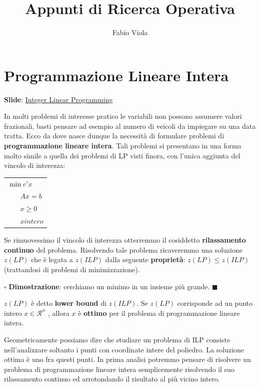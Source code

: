 \documentclass[11pt]{book}
\title{Appunti di Ricerca Operativa}
\author{Fabio Viola}
\date{}
\begin{document}
\chapter{Programmazione Lineare Intera}

\scriptsize
{\bf Slide}:
\href{http://www.or.deis.unibo.it/staff_pages/martello/Chapter6.zip}{Integer
Linear Programming}
\normalsize
\vspace{20pt}

In molti problemi di interesse pratico le variabili non possono
assumere valori frazionali, basti pensare ad esempio al numero di
veicoli da impiegare su una data tratta. Ecco da dove nasce dunque la
necessit\`a di formulare problemi di {\bf programmazione lineare
  intera}. Tali problemi si presentano in una forma molto simile a
quella dei problemi di LP visti finora, con l'unica aggiunta del
vincolo di interezza:

\vspace{11pt}
\begin{center}
  \begin{tabular}{l}
    $\min c'x$\\
    $\phantom{min}Ax = b$\\
    $\phantom{min}x \geq 0$\\
    $\phantom{min}x intero$\\
  \end{tabular}
\end{center}
\vspace{11pt}

Se rimuovessimo il vincolo di interezza otterremmo il cosiddetto {\bf
  rilassamento continuo} del problema. Risolvendo tale problema
ricaveremmo una soluzione $z(LP)$ che \`e legata a $z(ILP)$ dalla
seguente {\bf propriet\`a}: $z(LP) \leq z(ILP)$ (trattandosi di
problemi di minimizzazione).

\vspace{11pt} $\square$ {\bf Dimostrazione}: cerchiamo un minimo in un
insieme pi\`u grande.  $\blacksquare$
\vspace{11pt}

$z(LP)$ \`e detto {\bf lower bound} di $z(ILP)$. Se $z(LP)$
corrisponde ad un punto intero $x \in \mathcal{R}^n$ , allora $x$ \`e
{\bf ottimo} per il problema di programmazione lineare intera.

Geometricamente possiamo dire che studiare un problema di ILP consiste
nell'analizzare soltanto i punti con coordinate intere del
poliedro. La soluzione ottima \`e uno fra questi punti. In prima
analisi potremmo pensare di risolvere un problema di programmazione
lineare intera semplicemente risolvendo il suo rilassamento continuo
ed arrotondando il risultato al pi\`u vicino intero.
\end{document}
